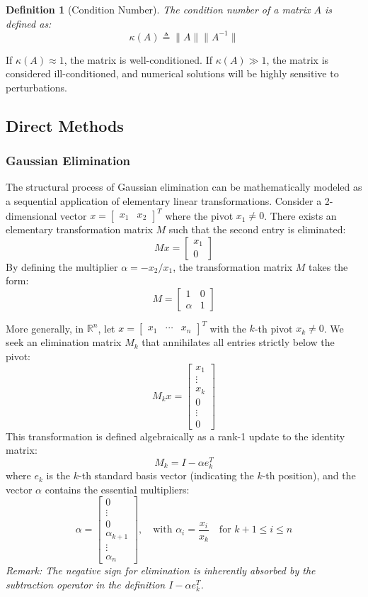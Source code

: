\documentclass[12pt, a4paper]{article}
\theoremstyle{break}
\newtheorem{definition}{Definition}[section]
\begin{document}
\begin{definition}[Condition Number]
The condition number of a matrix $A$ is defined as:
$$\kappa(A) \triangleq \|A\| \|A^{-1}\|$$
\end{definition}
If $\kappa(A) \approx 1$, the matrix is well-conditioned. If $\kappa(A) \gg 1$, the matrix is considered ill-conditioned, and numerical solutions will be highly sensitive to perturbations.

\subsection{Direct Methods}
\subsubsection{Gaussian Elimination}
The structural process of Gaussian elimination can be mathematically modeled as a sequential application of elementary linear transformations.
Consider a 2-dimensional vector $x = \begin{bmatrix} x_1 & x_2 \end{bmatrix}^T$ where the pivot $x_1 \neq 0$.
There exists an elementary transformation matrix $M$ such that the second entry is eliminated:
\[
Mx = \begin{bmatrix} x_1 \\ 0 \end{bmatrix}
\]
By defining the multiplier $\alpha = -x_2/x_1$, the transformation matrix $M$ takes the form:
\[
M = \begin{bmatrix} 1 & 0 \\ \alpha & 1 \end{bmatrix}
\]

More generally, in $\mathbb{R}^n$, let $x = \begin{bmatrix} x_1 & \cdots & x_n \end{bmatrix}^T$ with the $k$-th pivot $x_k \neq 0$.
We seek an elimination matrix $M_k$ that annihilates all entries strictly below the pivot:
\[
M_k x = \begin{bmatrix} x_1 \\ \vdots \\ x_k \\ 0 \\ \vdots \\ 0 \end{bmatrix}
\]
This transformation is defined algebraically as a rank-1 update to the identity matrix:
\[
M_k = I - \alpha e_k^T
\]
where $e_k$ is the $k$-th standard basis vector (indicating the $k$-th position), and the vector $\alpha$ contains the essential multipliers:
\[
\alpha = \begin{bmatrix} 0 \\ \vdots \\ 0 \\ \alpha_{k+1} \\ \vdots \\ \alpha_n \end{bmatrix}, \quad \text{with } \alpha_i = \frac{x_i}{x_k} \quad \text{for } k+1 \le i \le n
\]
\textit{Remark: The negative sign for elimination is inherently 
absorbed by the subtraction operator in the definition $I - \alpha e_k^T$.}
\end{document}
